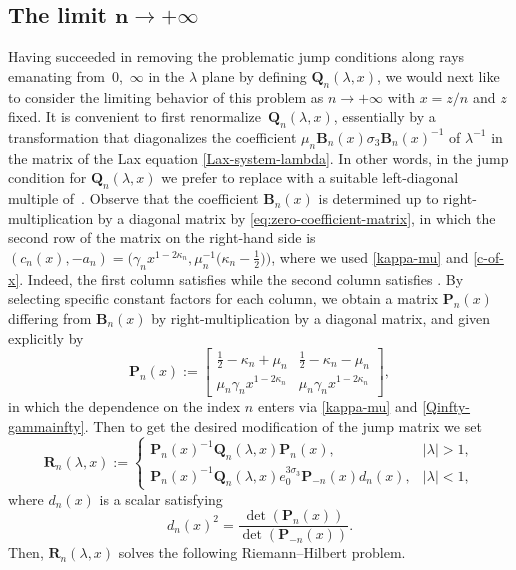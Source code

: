\documentclass[11pt]{article}
\numberwithin{equation}{section}
\numberwithin{equation}{section}
\newcommand{\para}[1]{\breve{#1}}
\begin{document}
\subsection[The limit n to infinity]{The limit $\boldsymbol{n\to+\infty}$}
Having succeeded in removing the problematic jump conditions along rays emanating from~$0$,~$\infty$ in the $\lambda$ plane by defining $\mathbf{Q}_n(\lambda,x)$, we would next like to consider the limiting behavior of this problem as $n\to+\infty$ with $x=z/n$ and $z$ fixed. It is convenient to first renormalize~$\mathbf{Q}_n(\lambda,x)$, essentially by a transformation that diagonalizes the coefficient $\mu_n \mathbf{B}_n(x)\sigma_3\mathbf{B}_n(x)^{-1}$ of $\lambda^{-1}$ in the matrix of the Lax equation \eqref{Lax-system-lambda}.
In other words, in the jump condition for $\mathbf{Q}_n(\lambda,x)$ we prefer to replace \smash{$\para{\mathbf{\Phi}}_n^{(\infty)}(\lambda,x)$} with a suitable left-diagonal multiple of~\smash{$\mathbf{B}_n(x)^{-1}\para{\mathbf{\Phi}}_n^{(\infty)}(\lambda,x)$}. Observe that the coefficient $\mathbf{B}_n(x)$ is determined up to right-multiplication by a diagonal matrix by
\eqref{eq:zero-coefficient-matrix}, in which the second row of the matrix on the right-hand side is $(c_n(x),-a_n)=\big(\gamma_n x^{1-2\kappa_n},\mu_n ^{-1}\big(\kappa_n-\frac{1}{2}\big)\big)$, where we used \eqref{kappa-mu} and \eqref{c-of-x}. Indeed, the first column  satisfies  while the second column  satisfies . By selecting specific constant factors for each column, we obtain a matrix $\mathbf{P}_n(x)$ differing from $\mathbf{B}_n(x)$ by right-multiplication by a diagonal matrix, and given explicitly by
\begin{equation*}
 \mathbf{P}_n(x):=\begin{bmatrix}\frac{1}{2}-\kappa_n+\mu_n & \frac{1}{2}-\kappa_n-\mu_n \\
 \mu_n \gamma_n x^{1-2\kappa_n} & \mu_n \gamma_n x^{1-2\kappa_n}\end{bmatrix},
\end{equation*}
in which the dependence on the index $n$ enters via \eqref{kappa-mu} and \eqref{Qinfty-gammainfty}. Then to get the desired modification of the jump matrix we set
\begin{equation*}
 \mathbf{R}_n(\lambda,x):=\begin{cases}
 \mathbf{P}_n(x)^{-1}\mathbf{Q}_n(\lambda,x)\mathbf{P}_n(x),& |\lambda|>1,\\
 \mathbf{P}_n(x)^{-1}\mathbf{Q}_n(\lambda,x)e_0^{3\sigma_3}\mathbf{P}_{-n}(x)d_n(x),& |\lambda|<1,
 \end{cases}
\end{equation*}
where $d_n(x)$ is a scalar satisfying
\begin{equation}
 d_n(x)^2 = \frac{\det(\mathbf{P}_{n}(x))}{\det(\mathbf{P}_{-n}(x))}.
 \label{eq:dn-squared}
\end{equation}
Then, $\mathbf{R}_n(\lambda,x)$ solves the following
Riemann--Hilbert problem.
\end{document}
